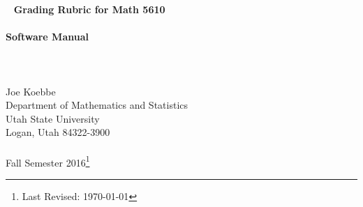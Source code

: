 \begin{center}
  \
  \vskip1.5in
  {\Large{\bf
    Grading Rubric for Math 5610 \\
  \ \\
    Software Manual \\
  \ \\
  \ \\
  \ \\
  }}
  \vskip1.5in
  Joe Koebbe \\
  Department of Mathematics and Statistics \\
  Utah State University \\
  Logan, Utah 84322-3900 \\
   \ \\
  Fall Semester 2016\footnote{Last Revised: \today}
\end{center}

